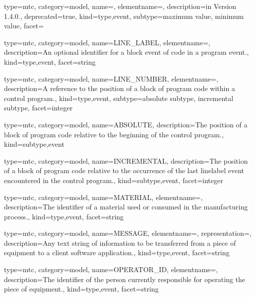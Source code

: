 {
  type=mtc,
  category=model,
  name=,
  elementname=,
  description={\DEPRECATED in Version 1.4.0.},
  deprecated={true},
  kind={type,event},
  subtype={\gls{maximum value}, \gls{minimum value}},
  facet={}
}



{
  type=mtc,
  category=model,
  name={LINE\_LABEL},
  elementname=,
  description={An optional identifier for a \gls{block event} of code in a \gls{program event}.},
  kind={type,event},
  facet={\gls{string}}
}


{
  type=mtc,
  category=model,
  name={LINE\_NUMBER},
  elementname=,
  description={A reference to the position of a block of program code within a control program.},
  kind={type,event},
  subtype={\gls{absolute subtype}, \gls{incremental subtype}},
  facet={\gls{integer}}
}


{
  type=mtc,
  category=model,
  name={ABSOLUTE},
  description={The position of a block of program code relative to the beginning of the control program.},
  kind={subtype,event}
}


{
  type=mtc,
  category=model,
  name={INCREMENTAL},
  description={The position of a block of program code relative to the occurrence of the last \gls{linelabel event} encountered in the control program.},
  kind={subtype,event},
  facet={\gls{integer}}
}


{
  type=mtc,
  category=model,
  name={MATERIAL},
  elementname=,
  description={The identifier of a material used or consumed in the manufacturing process.},
  kind={type,event},
  facet={\gls{string}}
}


{
  type=mtc,
  category=model,
  name={MESSAGE},
  elementname=,
  representation=,
  description={Any text string of information to be transferred from a piece of equipment to a client software application.},
  kind={type,event},
  facet={\gls{string}}
}


{
  type=mtc,
  category=model,
  name={OPERATOR\_ID},
  elementname=,
  description={The identifier of the person currently responsible for operating the piece of equipment.},
  kind={type,event},
  facet={\gls{string}}
}



